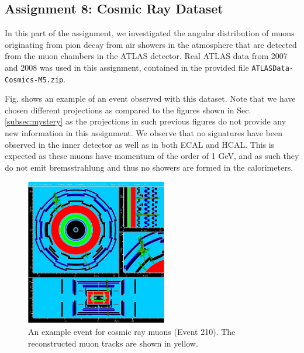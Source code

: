 \documentclass[a4paper]{report}
\numberwithin{equation}{section}
\begin{document}
\subsection{Assignment 8: Cosmic Ray Dataset}

In this part of the assignment, we investigated the angular distribution 
of muons originating from pion decay from air showers in the atmosphere
that are detected from the muon chambers in the ATLAS detector. Real ATLAS data from 2007 and 
2008 was used in this assignment, contained in the provided file 
\texttt{ATLASData-Cosmics-M5.zip}. \par 

Fig. shows an example of an event observed with this dataset. Note that we have chosen different projections as compared to the figures 
shown in Sec. \ref{subsec:mystery} as the projections in such previous figures do not provide any new information in this assignment.
 We observe that no signatures have been observed in the inner detector as well as in both ECAL and HCAL. This is expected as these muons 
 have momentum of the order of 1 GeV, and as such they do not emit bremsstrahlung and thus no showers are formed in the calorimeters. \par 

\begin{figure}[htpb]
    \centering
    \includegraphics[width=0.55\textwidth]{muon_event210.eps}
    \caption{An example event for cosmic ray muons (Event 210). The reconstructed muon tracks are shown in yellow.}
    \label{fig:crevent210}
\end{figure}
\end{document}
